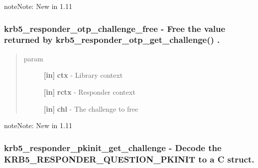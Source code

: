 \documentclass[letterpaper,10pt,english]{sphinxmanual}
\begin{document}
\begin{notice}{note}{Note:}
New in 1.11
\end{notice}


\subsubsection{krb5\_responder\_otp\_challenge\_free -  Free the value returned by krb5\_responder\_otp\_get\_challenge() .}
\label{appdev/refs/api/krb5_responder_otp_challenge_free:krb5-responder-otp-challenge-free-free-the-value-returned-by-krb5-responder-otp-get-challenge}\label{appdev/refs/api/krb5_responder_otp_challenge_free::doc}

\begin{fulllineitems}
\label{appdev/refs/api/krb5_responder_otp_challenge_free:krb5_responder_otp_challenge_free}
\end{fulllineitems}

\begin{quote}\begin{description}
\item[{param}] \leavevmode
\textbf{{[}in{]}} \textbf{ctx} - Library context

\textbf{{[}in{]}} \textbf{rctx} - Responder context

\textbf{{[}in{]}} \textbf{chl} - The challenge to free

\end{description}\end{quote}

\begin{notice}{note}{Note:}
New in 1.11
\end{notice}


\subsubsection{krb5\_responder\_pkinit\_get\_challenge -  Decode the KRB5\_RESPONDER\_QUESTION\_PKINIT to a C struct.}
\label{appdev/refs/api/krb5_responder_pkinit_get_challenge:krb5-responder-pkinit-get-challenge-decode-the-krb5-responder-question-pkinit-to-a-c-struct}\label{appdev/refs/api/krb5_responder_pkinit_get_challenge::doc}
\end{document}
